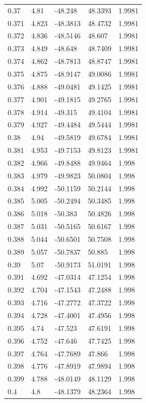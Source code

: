 \begin{tabular}{lllll}
0.37 & 4.81 & -48.248 & 48.3393 & 1.9981 \\
0.371 & 4.823 & -48.3813 & 48.4732 & 1.9981 \\
0.372 & 4.836 & -48.5146 & 48.607 & 1.9981 \\
0.373 & 4.849 & -48.648 & 48.7409 & 1.9981 \\
0.374 & 4.862 & -48.7813 & 48.8747 & 1.9981 \\
0.375 & 4.875 & -48.9147 & 49.0086 & 1.9981 \\
0.376 & 4.888 & -49.0481 & 49.1425 & 1.9981 \\
0.377 & 4.901 & -49.1815 & 49.2765 & 1.9981 \\
0.378 & 4.914 & -49.315 & 49.4104 & 1.9981 \\
0.379 & 4.927 & -49.4484 & 49.5444 & 1.9981 \\
0.38 & 4.94 & -49.5819 & 49.6784 & 1.9981 \\
0.381 & 4.953 & -49.7153 & 49.8123 & 1.9981 \\
0.382 & 4.966 & -49.8488 & 49.9464 & 1.998 \\
0.383 & 4.979 & -49.9823 & 50.0804 & 1.998 \\
0.384 & 4.992 & -50.1159 & 50.2144 & 1.998 \\
0.385 & 5.005 & -50.2494 & 50.3485 & 1.998 \\
0.386 & 5.018 & -50.383 & 50.4826 & 1.998 \\
0.387 & 5.031 & -50.5165 & 50.6167 & 1.998 \\
0.388 & 5.044 & -50.6501 & 50.7508 & 1.998 \\
0.389 & 5.057 & -50.7837 & 50.885 & 1.998 \\
0.39 & 5.07 & -50.9173 & 51.0191 & 1.998 \\
0.391 & 4.692 & -47.0314 & 47.1254 & 1.998 \\
0.392 & 4.704 & -47.1543 & 47.2488 & 1.998 \\
0.393 & 4.716 & -47.2772 & 47.3722 & 1.998 \\
0.394 & 4.728 & -47.4001 & 47.4956 & 1.998 \\
0.395 & 4.74 & -47.523 & 47.6191 & 1.998 \\
0.396 & 4.752 & -47.646 & 47.7425 & 1.998 \\
0.397 & 4.764 & -47.7689 & 47.866 & 1.998 \\
0.398 & 4.776 & -47.8919 & 47.9894 & 1.998 \\
0.399 & 4.788 & -48.0149 & 48.1129 & 1.998 \\
0.4 & 4.8 & -48.1379 & 48.2364 & 1.998 \\

\end{tabular}
